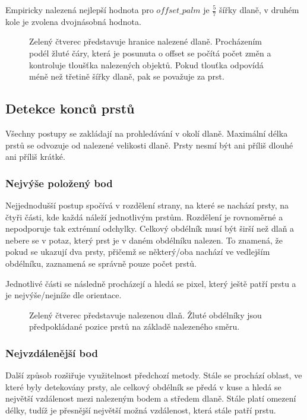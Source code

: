 Empiricky nalezená nejlepší hodnota pro $ offset\_palm $ je $ \frac{5}{7} $ šířky dlaně, v druhém kole je zvolena dvojnásobná hodnota. 

\begin{figure}[htp]
\centering
{}
\caption{Zelený čtverec představuje hranice nalezené dlaně. Procházením podél žluté čáry, která je posunuta o offset se počítá počet změn a kontroluje tloušťka nalezených objektů. Pokud tlouťka odpovídá méně než třetině šířky dlaně, pak se považuje za prst.}
\label{pic19}
\end{figure}
\newpage
\subsection{Detekce konců prstů}
Všechny postupy se zakládají na prohledávání v okolí dlaně. Maximální délka prstů se odvozuje od nalezené velikosti dlaně. Prsty nesmí být ani příliš dlouhé ani příliš krátké.\\

\subsubsection{Nejvýše položený bod}
Nejjednodušší postup spočívá v rozdělení strany, na které se nachází prsty, na čtyři části, kde každá náleží jednotlivým prstům. Rozdělení je rovnoměrné a nepodporuje tak extrémní odchylky. Celkový obdélník musí být širší než dlaň a nebere se v potaz, který prst je v daném obdélníku nalezen. To znamená, že pokud se ukazují dva prsty, přičemž se některý/oba nachází ve vedlejším obdélníku, zaznamená se správně pouze počet prstů.

Jednotlivé části se následně procházejí a hledá se pixel, který ještě patří prstu a je nejvýše/nejníže dle orientace.\\

\begin{figure}[htp]
\centering
{}
\caption{Zelený čtverec představuje nalezenou dlaň. Žluté obdélníky jsou předpokládané pozice prstů na základě nalezeného směru.}
\label{pic20}
\end{figure}

\subsubsection{Nejvzdálenější bod}
Další způsob rozšiřuje využitelnost předchozí metody. Stále se prochází oblast, ve které byly detekovány prsty, ale celkový obdélník se předá v kuse a hledá se největší vzdálenost mezi nalezeným bodem a středem dlaně. Stále platí omezení délky, tudíž je přesnější největší možná vzdálenost, která stále patří prstu.

